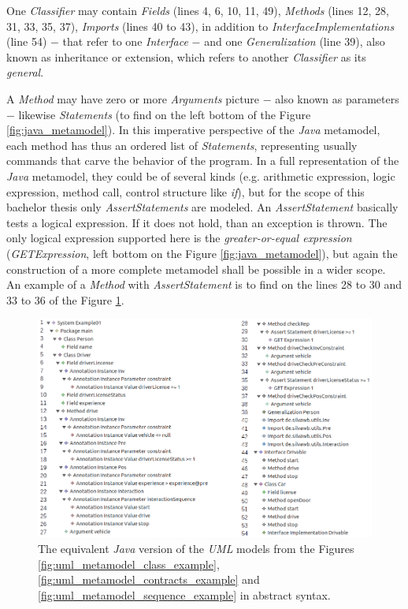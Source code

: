 \documentclass[tuberlin,cic,tc,english,noabntcite]{iiufrgs}
\begin{document}
One \emph{Classifier} may contain \emph{Fields} (lines 4, 6, 10, 11, 49), \emph{Methods} (lines 12, 28, 31, 33, 35, 37), \emph{Imports} (lines 40 to 43), in addition to \emph{InterfaceImplementations} (line 54) $-$ that refer to one \emph{Interface} $-$ and one \emph{Generalization} (line 39), also known as inheritance or extension, which refers to another \emph{Classifier} as its \emph{general}.

A \emph{Method} may have zero or more \emph{Arguments} picture $-$ also known as parameters $-$ likewise \emph{Statements} (to find on the left bottom of the Figure \ref{fig:java_metamodel}). In this imperative perspective of the \emph{Java} metamodel, each method has thus an ordered list of \emph{Statements}, representing usually commands that carve the behavior of the program. In a full representation of the \emph{Java} metamodel, they could be of several kinds (e.g. arithmetic expression, logic expression, method call, control structure like \emph{if}), but for the scope of this bachelor thesis only \emph{AssertStatements} are modeled. An \emph{AssertStatement} basically tests a logical expression. If it does not hold, than an exception is thrown. The only logical expression supported here is the \emph{greater-or-equal expression} (\emph{GETExpression}, left bottom on the Figure \ref{fig:java_metamodel}), but again the construction of a more complete metamodel shall be possible in a wider scope. An example of a \emph{Method} with \emph{AssertStatement} is to find on the lines 28 to 30 and 33 to 36 of the Figure \ref{fig:java_metamodel_example}.

\begin{figure}[H]
    \caption{The equivalent \emph{Java} version of the \emph{UML} models from the Figures \ref{fig:uml_metamodel_class_example},  \ref{fig:uml_metamodel_contracts_example} and \ref{fig:uml_metamodel_sequence_example} in abstract syntax.}
    \begin{center}
        \includegraphics[width=\textwidth]{javaMetamodelExample01}
    \end{center}
    \label{fig:java_metamodel_example}
\end{figure}
\end{document}
